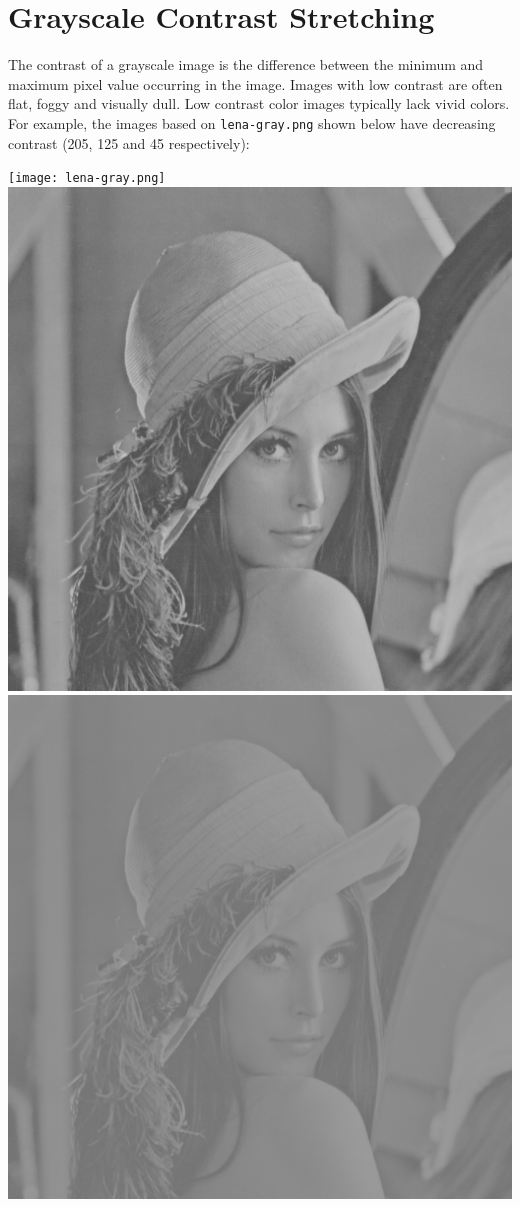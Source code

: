 \documentclass{book}
\begin{document}
\section{Grayscale Contrast Stretching}\label{sec:contrast-stretching}
The contrast of a grayscale image is the difference between the minimum and maximum pixel value occurring in the image. Images with low contrast are often flat, foggy and visually dull. Low contrast color images typically lack vivid colors. For example, the images based on \texttt{lena-gray.png} shown below have decreasing contrast (205, 125 and 45 respectively):
\begin{center}
\texttt{[image: lena-gray.png]}
\includegraphics[scale=0.2]{lena-reduced-contrast-125.png}
\includegraphics[scale=0.2]{lena-reduced-contrast-45.png}
\end{center}
\end{document}
